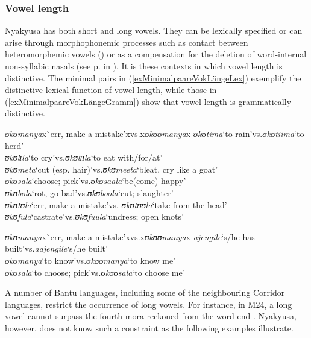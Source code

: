 \subsubsection{Vowel length}\label{VowelLength}  
Nyakyusa has both short and long vowels. They can be lexically specified or can arise through morphophonemic processes such as contact between heteromorphemic vowels () or as a compensation for the deletion of word-internal non-syllabic nasals (see p.\nobreakspace\pageref{NasalDelition} in ). It is these contexts in which vowel length is distinctive. The minimal pairs in (\ref{exMinimalpaareVokLängeLex}) exemplify the distinctive lexical function of vowel length, while those in (\ref{exMinimalpaareVokLängeGramm}) show that vowel length is grammatically distinctive.
\begin{exe}
	\ex \label{exMinimalpaareVokLängeLex}
	\begin{tabbing}
		\textit{ʊkʊmanya}x\=`err, make a mistake'x\=vs.x\=\textit{ʊkʊʊmanya}x\=\kill
		\textit{ʊkʊtima}\>`to rain'\>vs.\>\textit{ʊkʊtiima}\>`to herd'
		\\\textit{ʊkʊlɪla}\>`to cry'\>vs.\>\textit{ʊkʊlɪɪla}\>`to eat with/for/at'
		\\\textit{ʊkʊmeta}\>`cut (esp. hair)'\>vs.\>\textit{ʊkʊmeeta}\>`bleat, cry like a goat'
		\\\textit{ʊkʊsala}\>`choose; pick'\>vs.\>\textit{ʊkʊsaala}\>`be(come) happy'
		\\\textit{ʊkʊbola}\>`rot, go bad'\>vs.\>\textit{ʊkʊboola}\>`cut; slaughter'
		\\\textit{ʊkʊtʊla}\>`err, make a mistake'\>vs. \>\textit{ʊkʊtʊʊla}\>`take from the head'
		\\\textit{ʊkʊfula}\>`castrate'\>vs.\>\textit{ʊkʊfuula}\>`undress; open knots'		
	\end{tabbing}	
	\ex \label{exMinimalpaareVokLängeGramm}
	\begin{tabbing}
		\textit{ʊkʊmanya}x\=`err, make a mistake'x\=vs.x\=\textit{ʊkʊʊmanya}x\=\kill
		\textit{ajengile}\>`s/he has built'\>vs.\>\textit{aajengile}\>`s/he built'\\
		\textit{ʊkʊmanya}\>`to know'\>vs.\>\textit{ʊkʊʊmanya}\>`to know me' \\
		\textit{ʊkʊsala}\>`to choose; pick'\>vs.\>\textit{ʊkʊʊsala}\>`to choose me'
	\end{tabbing}	
\end{exe}
A number of Bantu languages, including some of the neighbouring Corridor languages, restrict the occurrence of long vowels. For instance, in  M24, a long vowel cannot surpass the fourth mora reckoned from the word end \citep{KutschLojengaC2007}. Nyakyusa, however, does not know such a constraint as the following examples illustrate.

